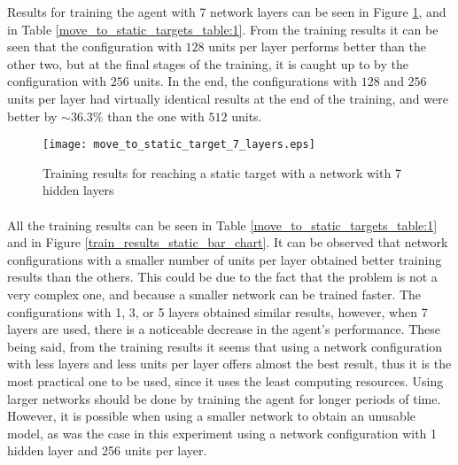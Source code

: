 Results for training the agent with 7 network layers can be seen in Figure \ref{train_results_static_7_layers}, and in Table \ref{move_to_static_targets_table:1}. From the training results it can be seen that the configuration with $128$ units per layer performs better than the other two, but at the final stages of the training, it is caught up to by the configuration with $256$ units. In the end, the configurations with $128$ and $256$ units per layer had virtually identical results at the end of the training, and were better by $\sim36.3\%$ than the one with $512$ units.

\begin{figure}
    \begin{center}
        \texttt{[image: move\_to\_static\_target\_7\_layers.eps]}
        \caption{Training results for reaching a static target with a network with 7 hidden layers}
        \label{train_results_static_7_layers}
    \end{center}
\end{figure}

\paragraph{}
All the training results can be seen in Table \ref{move_to_static_targets_table:1} and in Figure \ref{train_results_static_bar_chart}. It can be observed that network configurations with a smaller number of units per layer obtained better training results than the others. This could be due to the fact that the problem is not a very complex one, and because a smaller network can be trained faster. The configurations with 1, 3, or 5 layers obtained similar results, however, when 7 layers are used, there is a noticeable decrease in the agent's performance. These being said, from the training results it seems that using a network configuration with less layers and less units per layer offers almost the best result, thus it is the most practical one to be used, since it uses the least computing resources. Using larger networks should be done by training the agent for longer periods of time. However, it is possible when using a smaller network to obtain an unusable model, as was the case in this experiment using a network configuration with 1 hidden layer and 256 units per layer.

